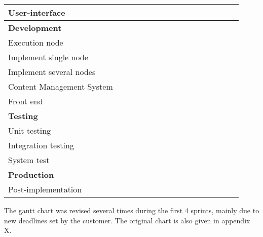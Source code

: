 \begin{tabular}{|l|l|l|l|l|l|l|l|l|l|l|l|l|l|l|l|}
\hline
User-interface&&&&&\cellcolor{MidnightBlue}&\cellcolor{MidnightBlue}&\cellcolor{MidnightBlue}&\cellcolor{MidnightBlue}&\cellcolor{MidnightBlue}&&&&&&  \\
\hline
\textbf{Development}&&&&\cellcolor{Purple}&\cellcolor{Purple}&\cellcolor{Purple}&\cellcolor{Purple}&\cellcolor{Purple}&\cellcolor{Purple}&\cellcolor{Purple}&\cellcolor{Purple}&&&&  \\
\hline
Execution node&&&&&&&&\cellcolor{Orchid}&\cellcolor{Orchid}&\cellcolor{Orchid}&\cellcolor{Orchid}&&&&  \\
\hline
Implement single node&&&&&&&&\cellcolor{Thistle}&\cellcolor{Thistle}&\cellcolor{Thistle}&&&&&  \\
\hline
Implement several nodes&&&&&&&&&\cellcolor{Thistle}&\cellcolor{Thistle}&&&&&  \\
\hline
Content Management System&&&&&&&&&&&\cellcolor{Orchid}&&&&  \\
\hline
Front end&&&&\cellcolor{Orchid}&\cellcolor{Orchid}&\cellcolor{Orchid}&\cellcolor{Orchid}&\cellcolor{Orchid}&\cellcolor{Orchid}&\cellcolor{Orchid}&\cellcolor{Orchid}&&&&  \\
\hline
\textbf{Testing}&&&&&&&\cellcolor{Red}&\cellcolor{Red}&\cellcolor{Red}&\cellcolor{Red}&\cellcolor{Red}&\cellcolor{Red}&\cellcolor{Red}&\cellcolor{Red}&\cellcolor{Red}  \\
\hline
Unit testing &&&&&&&\cellcolor{Orchid}&\cellcolor{Orchid}&\cellcolor{Orchid}&\cellcolor{Orchid}&\cellcolor{Orchid}&\cellcolor{Orchid}&\cellcolor{Orchid}&\cellcolor{Orchid}&\cellcolor{Orchid}  \\
\hline
Integration testing&&&&&&&&&\cellcolor{Melon}&\cellcolor{Melon}&\cellcolor{Melon}&\cellcolor{Melon}&\cellcolor{Melon}&\cellcolor{Melon}&\cellcolor{Melon}  \\
\hline
System test&&&&&&&&&\cellcolor{Melon}&\cellcolor{Melon}&\cellcolor{Melon}&\cellcolor{Melon}&\cellcolor{Melon}&\cellcolor{Melon}&\cellcolor{Melon}  \\
\hline
\textbf{Production}&&&&&&&&&&&&&&\cellcolor{MidnightBlue}&\cellcolor{MidnightBlue}  \\
\hline
Post-implementation&&&&&&&&&&&&&&&\cellcolor{Plum} \\
\hline
\end{tabular}\label{gantt}

The gantt chart was revised several times during the first 4 sprints,
mainly due to new deadlines set by the customer. The original chart is
also given in appendix X.

